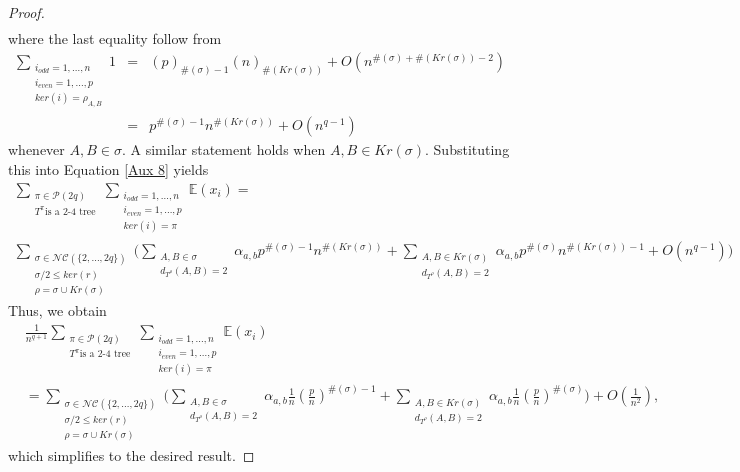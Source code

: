 \documentclass[10pt,a4paper]{amsart}
\newcommand{\E}{\mathbb{E}}
\newcommand{\NC}{\mathcal{NC}}
\newcommand{\cP}{\mathcal{P}}
\begin{document}
\begin{proof}
\begin{eqnarray*}
\end{eqnarray*}
where the last equality follow from
\begin{eqnarray*}
\sum_{\substack{i_{odd}=1,\dots,n \\ i_{even}=1,\dots,p \\ ker(i)=\rho_{A,B}}}1 &=& (p)_{\#(\sigma)-1}(n)_{\#(Kr(\sigma))}+O(n^{\#(\sigma)+\#(Kr(\sigma))-2}) \\
&=& p^{\#(\sigma)-1}n^{\#(Kr(\sigma))}+O(n^{q-1})
\end{eqnarray*}
whenever $A,B\in \sigma$. A similar statement holds when $A,B\in Kr(\sigma)$. Substituting this into Equation \ref{Aux 8} yields
\begin{multline}
\sum_{\substack{\pi\in \cP(2q)\\ T^\pi \text{is a 2-4 tree} }}\sum_{\substack{i_{odd}=1,\dots,n \\ i_{even}=1,\dots,p \\ ker(i)=\pi}}\E(x_i)= \\
\sum_{\substack{\sigma\in \NC(\{2,\dots,2q\}) \\ \sigma/2\leq ker(r) \\ \rho=\sigma\cup Kr(\sigma)}}\Bigg(\sum_{\substack{A,B\in \sigma \\ d_{T^\rho}(A,B)=2}}\alpha_{a,b}p^{\#(\sigma)-1}n^{\#(Kr(\sigma))} + \sum_{\substack{A,B\in Kr(\sigma) \\ d_{T^\rho}(A,B)=2}}\alpha_{a,b}p^{\#(\sigma)}n^{\#(Kr(\sigma))-1}+O(n^{q-1})\Bigg)
\end{multline}
Thus, we obtain
\begin{align*}
&\frac{1}{n^{q+1}}\sum_{\substack{\pi\in \cP(2q)\\ T^\pi \text{is a 2-4 tree} }}\sum_{\substack{i_{odd}=1,\dots,n \\ i_{even}=1,\dots,p \\ ker(i)=\pi}}\E(x_i) \\ 
&= \sum_{\substack{\sigma\in \NC(\{2,\dots,2q\}) \\ \sigma/2\leq ker(r) \\ \rho=\sigma\cup Kr(\sigma)}}\Bigg(\sum_{\substack{A,B\in \sigma \\ d_{T^\rho}(A,B)=2}}\alpha_{a,b}\frac{1}{n}\left(\frac{p}{n}\right)^{\#(\sigma)-1} + \sum_{\substack{A,B\in Kr(\sigma) \\ d_{T^\rho}(A,B)=2}}\alpha_{a,b}\frac{1}{n}\left(\frac{p}{n}\right)^{\#(\sigma)}\Bigg)+O(\frac{1}{n^2}),
\end{align*}
which simplifies to the desired result.
\end{proof}
\end{document}
